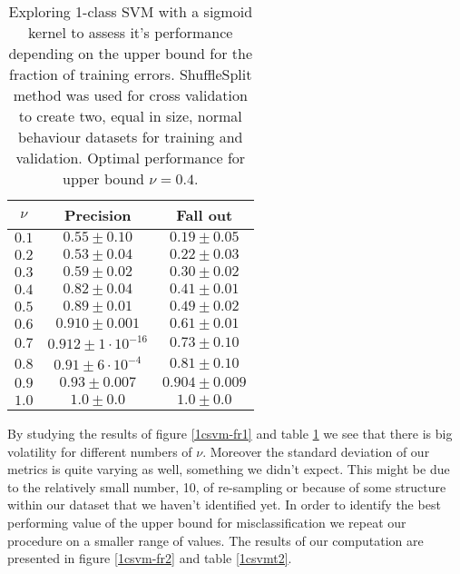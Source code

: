 \documentclass[reqno,openany,12pt]{amsbook}
\begin{document}
\begin{table}
\begin{tabular}{|c|c|c|}
\hline
$\nu$ &  Precision & Fall out \\ \hline 
$0.1$ &  $0.55 \pm 0.10$ & $0.19 \pm 0.05$ \\ \hline 
$0.2$ &  $0.53 \pm 0.04$ & $0.22 \pm 0.03$ \\ \hline 
$0.3$ &  $0.59 \pm 0.02$ & $0.30 \pm 0.02$ \\ \hline 
$0.4$ &  $0.82 \pm 0.04$ & $0.41 \pm 0.01$ \\ \hline 
$0.5$ &  $0.89 \pm 0.01$ & $0.49 \pm 0.02$ \\ \hline 
$0.6$ &  $0.910 \pm 0.001$ & $0.61 \pm 0.01$ \\ \hline 
$0.7$ &  $0.912 \pm 1\cdot 10^{-16}$ & $0.73 \pm 0.10$ \\ \hline 
$0.8$ &  $0.91 \pm 6\cdot 10^{-4}$ & $0.81 \pm 0.10$ \\ \hline 
$0.9$ &  $0.93 \pm 0.007$ & $0.904 \pm 0.009$ \\ \hline
$1.0$ &  $1.0 \pm 0.0$ & $1.0 \pm 0.0$ \\ \hline
\end{tabular}
\vspace{5pt}
\caption[1-class SVM performance depending on bound for training errors]{Exploring 1-class SVM with a sigmoid kernel to assess it's performance depending on the upper bound for the fraction of training errors. ShuffleSplit method was used for cross validation to create two, equal in size, normal behaviour datasets for training and validation. Optimal performance for upper bound $\nu = 0.4$.}
\label{1csvmt1}
\end{table}

By studying the results of figure \ref{1csvm-fr1} and table \ref{1csvmt1} we see that there is  big volatility for different numbers of $\nu$. Moreover the standard deviation of our metrics is quite varying as well, something we didn't expect. This might be due to the relatively small number, 10, of re-sampling
or because of some structure within our dataset that we haven't identified yet. In order to identify the best performing value of the upper bound for misclassification we repeat our procedure on a smaller range of values. The results of our computation are presented in figure \ref{1csvm-fr2} and table \ref{1csvmt2}.
\end{document}
